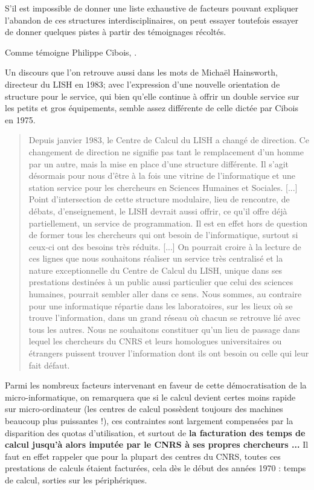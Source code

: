 S'il est impossible de donner une liste exhaustive de facteurs pouvant expliquer l'abandon de ces structures interdisciplinaires, on peut essayer toutefois essayer de donner quelques pistes à partir des témoignages récoltés.

Comme témoigne Philippe Cibois, .

Un discours que l’on retrouve aussi dans les mots de Michaël Hainsworth, directeur du LISH en 1983; avec l’expression d’une nouvelle orientation de structure pour le service, qui bien qu’elle continue à offrir un double service sur les petits et gros équipements, semble assez différente de celle dictée par Cibois en 1975.

\blockquote[\cite{Hainsworth1983}]{Depuis janvier 1983, le Centre de Calcul du LISH a changé de direction. Ce changement de direction ne signifie pas tant le remplacement d'un homme par un autre, mais la mise en place d'une structure différente. Il s'agit désormais pour nous d'être à la fois une vitrine de l'informatique et une station service pour les chercheurs en Sciences Humaines et Sociales. [...] Point d'intersection de cette structure modulaire, lieu de rencontre, de débats, d'enseignement, le LISH devrait aussi offrir, ce qu'il offre déjà partiellement, un service de programmation. Il est en effet hors de question de former tous les chercheurs qui ont besoin de l'informatique, surtout si ceux-ci ont des besoins très réduits. [...] On pourrait croire à la lecture de ces lignes que nous souhaitons réaliser un service très centralisé et la nature exceptionnelle du Centre de Calcul du LISH, unique dans ses prestations destinées à un public aussi particulier que celui des sciences humaines, pourrait sembler aller dans ce sens. Nous sommes, au contraire pour une informatique répartie dans les laboratoires, sur les lieux où se trouve l'information, dans un grand réseau où chacun se retrouve lié avec tous les autres. Nous ne souhaitons constituer qu'un lieu de passage dans lequel les chercheurs du CNRS et leurs homologues universitaires ou étrangers puissent trouver l'information dont ils ont besoin ou celle qui leur fait défaut.}

Parmi les nombreux facteurs intervenant en faveur de cette démocratisation de la micro-informatique, on remarquera que si le calcul devient certes moins rapide sur micro-ordinateur (les centres de calcul possèdent toujours des machines beaucoup plus puissantes !), ces contraintes sont largement compensées par la disparition des quotas d'utilisation, et surtout de \textbf{la facturation des temps de calcul jusqu’à alors imputée par le CNRS à ses propres chercheurs ...} Il faut en effet rappeler que pour la plupart des centres du CNRS, toutes ces prestations de calculs étaient facturées, cela dès le début des années 1970 : temps de calcul, sorties sur les périphériques.

